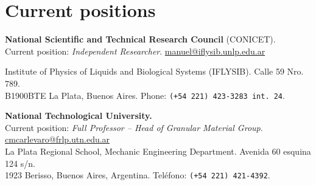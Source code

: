 \section{Current positions}

 \textbf{National Scientific and Technical Research Council} (CONICET). \\Current position: \textit{Independent Researcher}. \faEnvelopeO{} \href{mailto:manuel@iflysib.unlp.edu.ar}{manuel@iflysib.unlp.edu.ar}

  Institute of Physics of Liquids and Biological Systems (IFLYSIB). Calle 59 Nro. 789.\\ B1900BTE  La Plata, Buenos Aires. Phone: \texttt{(+54 221) 423-3283 int. 24}.

   \textbf{National Technological University.} \\Current position: \textit{Full Professor -- Head of Granular Material Group}. \faEnvelopeO{} \href{mailto:manuel@iflysib.unlp.edu.ar}{cmcarlevaro@frlp.utn.edu.ar} \\
La Plata Regional School, Mechanic Engineering Department. Avenida 60 esquina 124 s/n. \\1923 Berisso, Buenos Aires, Argentina. Teléfono: \texttt{(+54 221) 421-4392}.

  
% 
